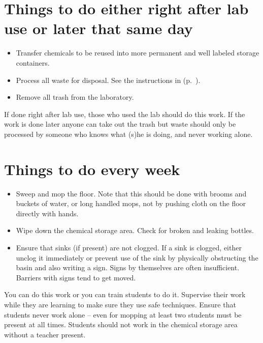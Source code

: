 \section{Things to do either right after lab use or later that same day}
\begin{itemize}
\item{Transfer chemicals to be reused into more permanent 
and well labeled storage containers.}
\item{Process all waste for disposal. 
See the instructions in  (p.~\pageref{cha:wastedisp}).}
\item{Remove all trash from the laboratory.}
\end{itemize}
If done right after lab use, 
those who used the lab should do this work. 
If the work is done later 
anyone can take out the trash 
but waste should only be processed 
by someone who knows what (s)he is doing, 
and never working alone.

\section{Things to do every week}
\begin{itemize}
\item{Sweep and mop the floor. 
Note that this should be done with brooms and buckets of water, 
or long handled mops, 
not by pushing cloth on the floor directly with hands.}
\item{Wipe down the chemical storage area. 
Check for broken and leaking bottles.}
\item{Ensure that sinks (if present) are not clogged. 
If a sink is clogged, 
either unclog it immediately or prevent use of the sink 
by physically obstructing the basin and also writing a sign. 
Signs by themselves are often insufficient. 
Barriers with signs tend to get moved.}
\end{itemize}
You can do this work or you can train students to do it. 
Supervise their work while they are learning 
to make sure they use safe techniques. 
Ensure that students never work alone -- 
even for mopping at least two students must be present at all times. 
Students should not work in the chemical storage area 
without a teacher present.

